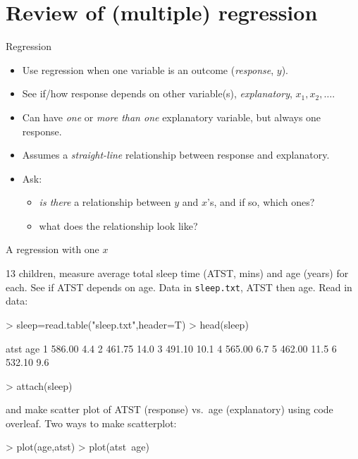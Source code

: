 \section{Review of (multiple) regression}

\begin{frame}{Regression}

  \begin{itemize}
  \item Use regression when one variable is an outcome ({\em response}, $y$).
  \item See if/how response depends on other variable(s), {\em explanatory}, $x_1, x_2,\ldots$.
  \item Can have {\em one} or {\em more than one} explanatory variable, but always one response.
  \item Assumes a {\em straight-line} relationship between response and explanatory.
  \item Ask: 
    \begin{itemize}
    \item {\em is there} a relationship between $y$ and $x$'s, and if so, which ones?
    \item what does the relationship look like?
    \end{itemize}

  \end{itemize}
  
\end{frame}

\begin{frame}[fragile]{A regression with one $x$}

13 children, measure average total sleep time (ATST, mins) and age (years) for each. See if ATST depends on age. Data in \verb-sleep.txt-, ATST then age. Read in data:

\begin{Schunk}
\begin{Sinput}
> sleep=read.table("sleep.txt",header=T)
> head(sleep)
\end{Sinput}
\begin{Soutput}
    atst  age
1 586.00  4.4
2 461.75 14.0
3 491.10 10.1
4 565.00  6.7
5 462.00 11.5
6 532.10  9.6
\end{Soutput}
\begin{Sinput}
> attach(sleep)
\end{Sinput}
\end{Schunk}

and make scatter plot of ATST (response) vs.\ age (explanatory) using
code overleaf. Two ways to make scatterplot:

\begin{Schunk}
\begin{Sinput}
> plot(age,atst)
> plot(atst~age)
\end{Sinput}
\end{Schunk}




\end{frame}




